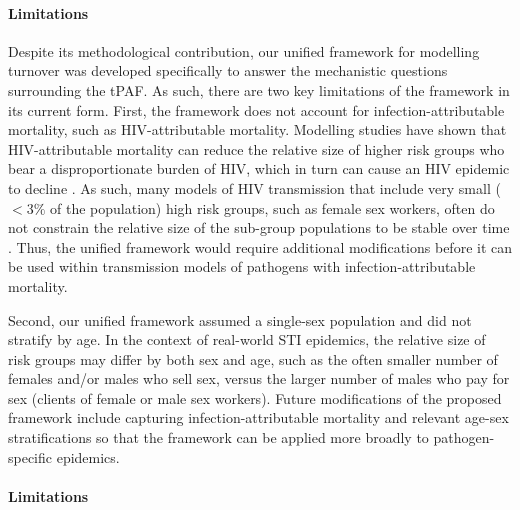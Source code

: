\paragraph{Limitations}
Despite its methodological contribution, our unified 
framework for modelling turnover was developed specifically 
to answer the mechanistic questions surrounding the tPAF. 
As such, there are two key limitations of the framework in its current form.
First, the framework does not account for						%
infection-attributable mortality, such as HIV-attributable mortality.
Modelling studies have shown that HIV-attributable mortality can reduce the 
relative size of higher risk groups who bear a disproportionate burden of HIV, which in turn 
can cause an HIV epidemic to decline \citep{Boily1997}.
As such, many models of HIV transmission
that include very small ($<3\%$ of the population)
high risk groups, such as female sex workers,
often do not constrain the relative size
of the sub-group populations to be stable over time
\citep{Pickles2013}. Thus, the unified framework would require 
additional modifications before it can be used within transmission models of 
pathogens with infection-attributable mortality.									

Second, our unified framework assumed a single-sex population and did not stratify by age.		%
In the context of real-world STI epidemics,
the relative size of risk groups may differ
by both sex and age,
such as the often smaller number of females and/or males who sell sex,
versus the larger number of males who pay for sex (clients of female or male sex workers).
Future modifications of the proposed framework include capturing
infection-attributable mortality and relevant age-sex stratifications so that
the framework can be applied more broadly to pathogen-specific epidemics.

\paragraph{Limitations}		%

